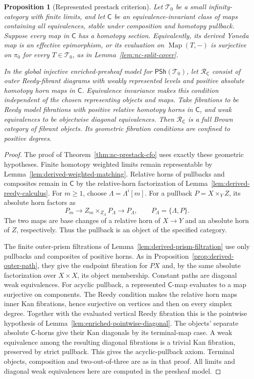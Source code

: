 \documentclass[12pt]{amsart}
\newtheorem{prop}[thm]{Proposition}
\theoremstyle{definition}
\theoremstyle{remark}
\numberwithin{equation}{section}
\newcommand{\PSh}{\mathsf{PSh}}
\DeclareMathOperator{\Map}{Map}
\begin{document}
\begin{prop}[Represented prestack criterion]
\label{prop:nc-prestack-criterion}
Let $\mathcal T_0$ be a small infinity-category with finite
limits, and let $\mathsf C$ be an equivalence-invariant class of
maps containing all equivalences, stable under composition and
homotopy pullback. Suppose every map in $\mathsf C$ has a homotopy
section. Equivalently, its derived Yoneda map is an effective
epimorphism, or its evaluation on $\Map(T,-)$ is surjective on
$\pi_0$ for every $T\in\mathcal T_0$, as in
Lemma~\ref{lem:nc-split-cover}.

In the global injective enriched-presheaf model for
$\PSh(\mathcal T_0)$, let $\mathscr R_{\mathsf C}$ consist of
outer Reedy-fibrant diagrams with weakly represented levels and
positive absolute homotopy horn maps in $\mathsf C$. Equivalence
invariance makes this condition independent of the chosen
representing objects and maps. Take fibrations to be Reedy model
fibrations with positive relative homotopy horns in $\mathsf C$,
and weak equivalences to be objectwise diagonal equivalences. Then
$\mathscr R_{\mathsf C}$ is a full Brown category of fibrant
objects. Its geometric fibration conditions are confined
to positive degrees.
\end{prop}

\begin{proof}
The proof of Theorem~\ref{thm:nc-prestack-cfo} uses exactly these
geometric hypotheses. Finite homotopy weighted limits remain
representable by Lemma~\ref{lem:derived-weighted-matching}.
Relative horns of pullbacks and composites remain in $\mathsf C$
by the relative-horn factorization of
Lemma~\ref{lem:derived-reedy-calculus}. For $m\ge1$, choose
$\Lambda=\Lambda^i[m]$. For a pullback $P=X\times_Y Z$,
its absolute horn factors as
\[
 P_m\longrightarrow Z_m\times_{Z_\Lambda}P_\Lambda
       \longrightarrow P_\Lambda,
 \qquad P_\Lambda=\{\Lambda,P\}.
\]
The two maps are base changes of a relative horn of $X\to Y$ and
an absolute horn of $Z$, respectively. Thus the pullback is an
object of the specified category.

The finite outer-prism filtrations of
Lemma~\ref{lem:derived-prism-filtration} use only pullbacks and
composites of positive horns. As in
Proposition~\ref{prop:derived-outer-path}, they give the endpoint
fibration for $PX$ and, by the same absolute factorization over
$X\times X$, its object membership. Constant paths are diagonal
weak equivalences. For acyclic pullback, a represented
$\mathsf C$-map evaluates to a map surjective on components. The
Reedy condition makes the relative horn maps inner Kan fibrations,
hence surjective on vertices and then on every simplex degree.
Together with the evaluated vertical Reedy fibration this is the
pointwise hypothesis of
Lemma~\ref{lem:enriched-pointwise-diagonal}.
The objects' separate absolute $\mathsf C$-horns
give their Kan diagonals by its terminal-map case.
A weak equivalence among the resulting diagonal
fibrations is a trivial Kan fibration, preserved by
strict pullback. This gives the acyclic-pullback axiom. Terminal
objects, composition and two-out-of-three are as in that proof.
All limits and diagonal weak equivalences here are computed
in the presheaf model.
\end{proof}
\end{document}
